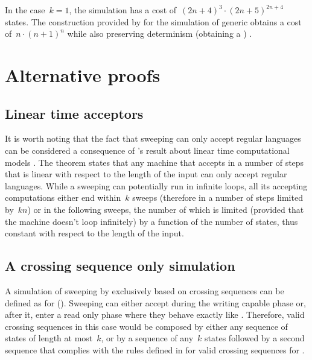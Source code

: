 In the case~$k=1$, the simulation has a cost of~$(2n+4)^3\cdot(2n+5)^{2n+4}$ states.
The construction provided by \citeauthor{PigPis14} \cite{PigPis14} for the simulation of generic \ODLAs obtains a cost of~$n\cdot (n+1)^n$ while also preserving determinism (\ie obtaining a \ODFA) \cite{PigPis14}.



\section{Alternative proofs}\label{sec:alt-proofs}


\subsection{Linear time acceptors}
It is worth noting that the fact that sweeping \kDLAs can only accept regular languages can be considered a consequence of \citeauthor{Hen65}'s result about linear time computational models \cite{Hen65}.
The theorem states that any machine that accepts in a number of steps that is linear with respect to the length of the input can only accept regular languages.
While a sweeping \kLA can potentially run in infinite loops, all its accepting computations either end within~$k$ sweeps (therefore in a number of steps limited by~$kn$) or in the following sweeps, the number of which is limited (provided that the machine doesn't loop infinitely) by a function of the number of states, thus constant with respect to the length of the input.


\subsection{A crossing sequence only simulation}
A simulation of sweeping \kDLAs by \ONFAs exclusively based on crossing sequences can be defined as for \TDFAs ().
Sweeping \kDLAs can either accept during the writing capable phase or, after it, enter a read only phase where they behave exactly like \TDFAs.
Therefore, valid crossing sequences in this case would be composed by either any sequence of states of length at most~$k$, or by a sequence of any~$k$ states followed by a second sequence that complies with the rules defined in  for valid crossing sequences for \TDFAs.

